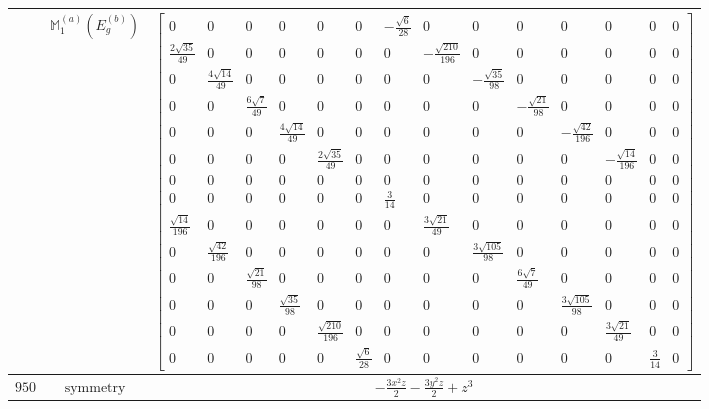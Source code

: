 \documentclass[fleqn,8pt,landscape]{jsarticle}
\begin{document}
\begin{longtable}{ccc}
$  $ & $ \mathbb{M}_{1}^{(a)}(E_{g}^{(b)}) $ & $ \begin{bmatrix} 0 & 0 & 0 & 0 & 0 & 0 & - \frac{\sqrt{6}}{28} & 0 & 0 & 0 & 0 & 0 & 0 & 0 \\ \frac{2 \sqrt{35}}{49} & 0 & 0 & 0 & 0 & 0 & 0 & - \frac{\sqrt{210}}{196} & 0 & 0 & 0 & 0 & 0 & 0 \\ 0 & \frac{4 \sqrt{14}}{49} & 0 & 0 & 0 & 0 & 0 & 0 & - \frac{\sqrt{35}}{98} & 0 & 0 & 0 & 0 & 0 \\ 0 & 0 & \frac{6 \sqrt{7}}{49} & 0 & 0 & 0 & 0 & 0 & 0 & - \frac{\sqrt{21}}{98} & 0 & 0 & 0 & 0 \\ 0 & 0 & 0 & \frac{4 \sqrt{14}}{49} & 0 & 0 & 0 & 0 & 0 & 0 & - \frac{\sqrt{42}}{196} & 0 & 0 & 0 \\ 0 & 0 & 0 & 0 & \frac{2 \sqrt{35}}{49} & 0 & 0 & 0 & 0 & 0 & 0 & - \frac{\sqrt{14}}{196} & 0 & 0 \\ 0 & 0 & 0 & 0 & 0 & 0 & 0 & 0 & 0 & 0 & 0 & 0 & 0 & 0 \\ 0 & 0 & 0 & 0 & 0 & 0 & \frac{3}{14} & 0 & 0 & 0 & 0 & 0 & 0 & 0 \\ \frac{\sqrt{14}}{196} & 0 & 0 & 0 & 0 & 0 & 0 & \frac{3 \sqrt{21}}{49} & 0 & 0 & 0 & 0 & 0 & 0 \\ 0 & \frac{\sqrt{42}}{196} & 0 & 0 & 0 & 0 & 0 & 0 & \frac{3 \sqrt{105}}{98} & 0 & 0 & 0 & 0 & 0 \\ 0 & 0 & \frac{\sqrt{21}}{98} & 0 & 0 & 0 & 0 & 0 & 0 & \frac{6 \sqrt{7}}{49} & 0 & 0 & 0 & 0 \\ 0 & 0 & 0 & \frac{\sqrt{35}}{98} & 0 & 0 & 0 & 0 & 0 & 0 & \frac{3 \sqrt{105}}{98} & 0 & 0 & 0 \\ 0 & 0 & 0 & 0 & \frac{\sqrt{210}}{196} & 0 & 0 & 0 & 0 & 0 & 0 & \frac{3 \sqrt{21}}{49} & 0 & 0 \\ 0 & 0 & 0 & 0 & 0 & \frac{\sqrt{6}}{28} & 0 & 0 & 0 & 0 & 0 & 0 & \frac{3}{14} & 0 \end{bmatrix} $ \\ \hline
$ 950 $ & $ \text{symmetry} $ & $ - \frac{3 x^{2} z}{2} - \frac{3 y^{2} z}{2} + z^{3} $ \\

\end{longtable}
\end{document}
